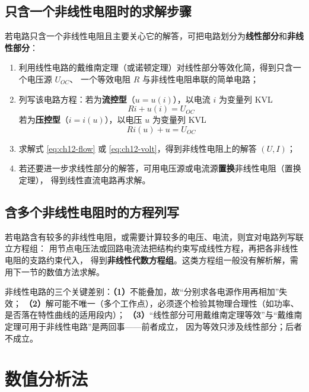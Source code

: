 \subsection{只含一个非线性电阻时的求解步骤}
若电路只含一个非线性电阻且主要关心它的解答，可把电路划分为\textbf{线性部分}和\textbf{非线性部分}：
\begin{enumerate}
  \item 利用线性电路的戴维南定理（或诺顿定理）对线性部分等效化简，得到只含一个电压源 $U_{OC}$、
        一个等效电阻 $R$ 与非线性电阻串联的简单电路；
  \item 列写该电路方程：若为\textbf{流控型}（$u=u(i)$），以电流 $i$ 为变量列 KVL
        \begin{equation}
          Ri+u(i)=U_{OC}
          \label{eq:ch12-flow}
        \end{equation}
        若为\textbf{压控型}（$i=i(u)$），以电压 $u$ 为变量列 KVL
        \begin{equation}
          Ri(u)+u=U_{OC}
          \label{eq:ch12-volt}
        \end{equation}
  \item 求解式 \eqref{eq:ch12-flow} 或 \eqref{eq:ch12-volt}，得到非线性电阻上的解答 $(U,I)$；
  \item 若还要进一步求线性部分的解答，可用电压源或电流源\textbf{置换}非线性电阻（置换定理），
        得到线性直流电路再求解。
\end{enumerate}

\subsection{含多个非线性电阻时的方程列写}
若电路含有较多的非线性电阻，或需要计算较多的电压、电流，则宜对电路列写联立方程组：
用节点电压法或回路电流法把结构约束写成线性方程，再把各非线性电阻的支路约束代入，
得到\textbf{非线性代数方程组}。这类方程组一般没有解析解，需用下一节的数值方法求解。

\begin{corepoint}{非线性电路的三个关键差别：\textbf{（1）}不能叠加，故“分别求各电源作用再相加”失效；
\textbf{（2）}解可能不唯一（多个工作点），必须逐个检验其物理合理性（如功率、是否落在特性曲线的适用段内）；
\textbf{（3）}“线性部分可用戴维南定理等效”与“戴维南定理可用于非线性电路”是两回事——前者成立，
因为等效只涉及线性部分；后者不成立。}
\end{corepoint}

\section{数值分析法}

